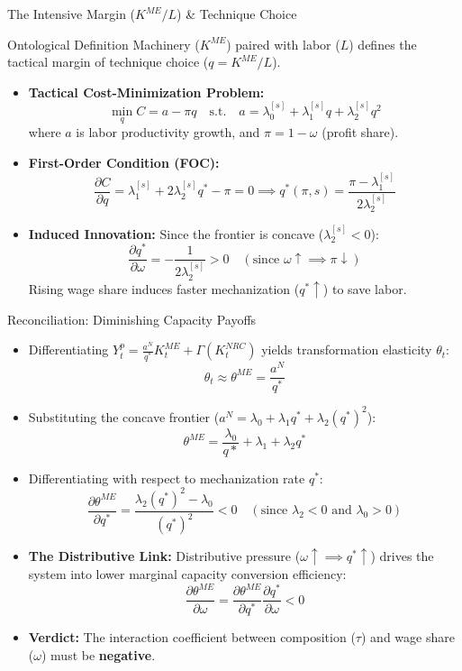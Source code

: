 \documentclass[10pt]{beamer}
\begin{document}
\begin{frame}{The Intensive Margin ($K^{ME}/L$) \& Technique Choice}
  \begin{block}{Ontological Definition}
    Machinery ($K^{ME}$) paired with labor ($L$) defines the tactical margin of technique choice ($q = K^{ME}/L$).
  \end{block}
  \begin{itemize}
    \item \textbf{Tactical Cost-Minimization Problem:}
      $$\min_{q} C = a - \pi q \quad \text{s.t.} \quad a = \lambda_0^{[s]} + \lambda_1^{[s]} q + \lambda_2^{[s]} q^2$$
      where $a$ is labor productivity growth, and $\pi = 1-\omega$ (profit share).
    \item \textbf{First-Order Condition (FOC):}
      $$\frac{\partial C}{\partial q} = \lambda_1^{[s]} + 2\lambda_2^{[s]}q^* - \pi = 0 \implies q^*(\pi, s) = \frac{\pi - \lambda_1^{[s]}}{2\lambda_2^{[s]}}$$
    \item \textbf{Induced Innovation:} Since the frontier is concave ($\lambda_2^{[s]} < 0$):
      $$\frac{\partial q^*}{\partial \omega} = -\frac{1}{2\lambda_2^{[s]}} > 0 \quad (\text{since } \omega \uparrow \implies \pi \downarrow)$$
      Rising wage share induces faster mechanization ($q^* \uparrow$) to save labor.
  \end{itemize}
\end{frame}

\begin{frame}{Reconciliation: Diminishing Capacity Payoffs}
  \begin{itemize}
    \item Differentiating $Y^p_t = \frac{a^N}{q^*} K^{ME}_t + \Gamma(K^{NRC}_t)$ yields transformation elasticity $\theta_t$:
      $$\theta_t \approx \theta^{ME} = \frac{a^N}{q^*}$$
    \item Substituting the concave frontier ($a^N = \lambda_0 + \lambda_1 q^* + \lambda_2 (q^*)^2$):
      $$\theta^{ME} = \frac{\lambda_0}{q*} + \lambda_1 + \lambda_2 q^*$$
    \item Differentiating with respect to mechanization rate $q^*$:
      $$\frac{\partial \theta^{ME}}{\partial q^*} = \frac{\lambda_2 (q^*)^2 - \lambda_0}{(q^*)^2} < 0 \quad (\text{since } \lambda_2 < 0 \text{ and } \lambda_0 > 0)$$
    \item \textbf{The Distributive Link:} Distributive pressure ($\omega \uparrow \implies q^* \uparrow$) drives the system into lower marginal capacity conversion efficiency:
      $$\frac{\partial \theta^{ME}}{\partial \omega} = \frac{\partial \theta^{ME}}{\partial q^*} \frac{\partial q^*}{\partial \omega} < 0$$
    \item \textbf{Verdict:} The interaction coefficient between composition ($\tau$) and wage share ($\omega$) must be \textbf{negative}.
  \end{itemize}
\end{frame}
\end{document}
